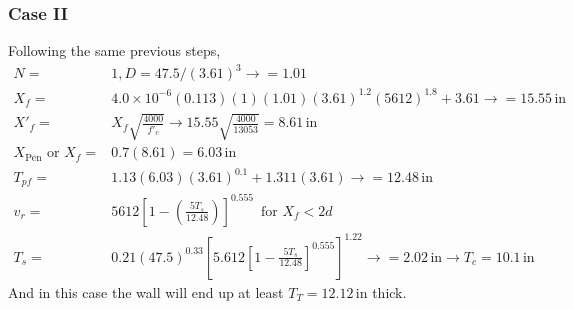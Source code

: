 \documentclass[]{article} %
\begin{document}
\subsubsection*{Case II}
Following the same previous steps,
\begin{align}\nonumber
N=&1, D=47.5/(3.61)^3\rightarrow=1.01\\\nonumber
X_f=&4.0\times 10^{-6}(0.113)(1)(1.01)(3.61)^{1.2}(5612)^{1.8}+3.61\rightarrow=15.55\,\mathrm{in}\\\nonumber
X'_f=&X_f\sqrt{\frac{4000}{f'_c}}\rightarrow 15.55\sqrt{\frac{4000}{13053}}=8.61\,\mathrm{in}\\\nonumber
X_\mathrm{Pen}\text{ or } X_f=&0.7(8.61)=6.03\,\mathrm{in}\\\nonumber
T_{pf}=&1.13(6.03)(3.61)^{0.1}+1.311(3.61)\rightarrow=12.48\,\mathrm{in}\\\nonumber
v_r=&5612\left[1-\left(\frac{5T_s}{12.48}\right)\right]^{0.555}\, \text{ for } X_f<2d\\\nonumber
T_s=&0.21(47.5)^{0.33}\left[5.612\left[1-\frac{5T_s}{12.48}\right]^{0.555}\right]^{1.22}\rightarrow=2.02\,\mathrm{in}\rightarrow T_c=10.1\,\mathrm{in}
\end{align}
And in this case the wall will end up at least $T_T=12.12\,\mathrm{in}$ thick.

      
      
\end{document}
